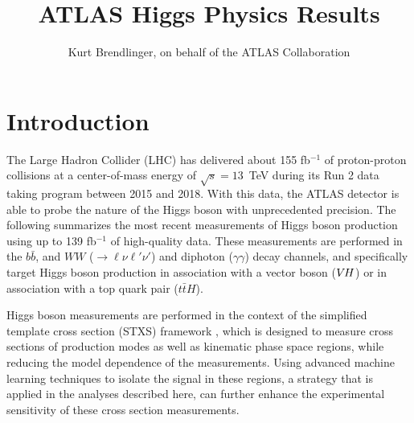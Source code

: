 \documentclass{moriond}
\def\vh{\texorpdfstring{\ensuremath{V\kern -0.1em H}\xspace}{VH\xspace}}
\begin{document}
\linenumbers

\vspace*{4cm}
\title{ATLAS Higgs Physics Results}

\author{ Kurt Brendlinger, on behalf of the ATLAS Collaboration }

\address{~\\DESY, Notkestra\ss e 85,\\ 22607 Hamburg, Germany}

\maketitle{}

\section{Introduction}

The Large Hadron Collider (LHC) \cite{Evans:2008zzb} has delivered about 155 fb$^{-1}$ of proton-proton
collisions at a center-of-mass energy of $\sqrt{s}=13$~TeV during its Run 2 data taking program
between 2015 and 2018.
With this data, the
ATLAS detector \cite{PERF-2007-01} is able to probe the nature of the Higgs boson with unprecedented
precision. The following summarizes the most recent measurements of Higgs boson production using up
to 139 fb$^{-1}$ of high-quality data. These measurements are performed in the $b\bar b$,
and $WW$ (${\rightarrow}\ell\nu\ell'\nu'$) and diphoton ($\gamma\gamma$) decay channels, and specifically
target Higgs boson production in association with a vector boson (\vh) or in association with a top
quark pair ($t\bar tH$).

Higgs boson measurements are performed in the context of the simplified template cross section
(STXS) framework \cite{deFlorian:2016spz,Badger:2016bpw},
which is designed to measure cross sections of production modes as well as kinematic phase space
regions, while reducing the model dependence of the measurements.
Using advanced machine learning techniques to isolate the signal in these regions,
a strategy that is applied in the analyses described here, can further enhance the experimental
sensitivity of these cross section measurements.
\end{document}
